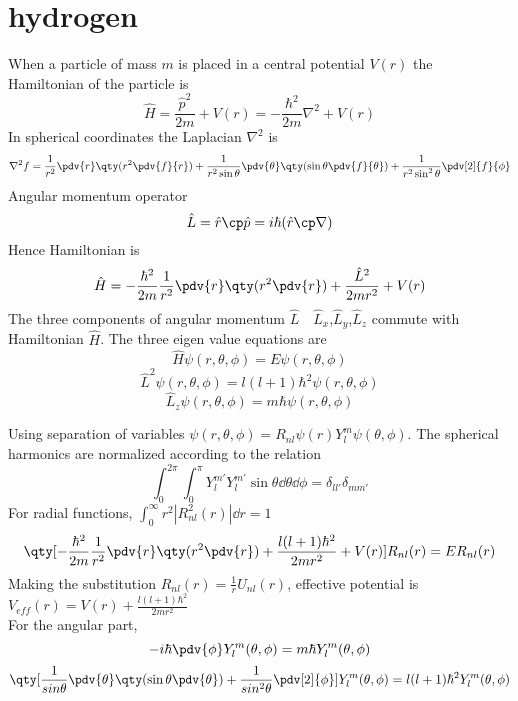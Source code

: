 \section*{hydrogen}

When a particle of mass $m$ is placed in a central potential $V(r)$ the Hamiltonian of the particle is \[\hat{H}=\frac{\hat{p}^2}{2m}+V(r)=-\frac{\hbar^2}{2m}\nabla^2+V(r)\] 
In spherical coordinates the Laplacian $\nabla^2$ is \[\nabla^2f=\frac{1}{r^2}\pdv{r}\qty(r^2\pdv{f}{r})+\frac{1}{r^2\sin\theta}\pdv{\theta}\qty(\sin\theta\pdv{f}{\theta})+\frac{1}{r^2\sin^2\theta}\pdv[2]{f}{\phi}\] 
Angular momentum operator \[\hat{L}=\hat{r}\cp\hat{p}=i\hbar(\hat{r}\cp\nabla)\]
Hence Hamiltonian is \[\hat{H}=-\frac{\hbar^2}{2m}\frac{1}{r^2}\pdv{r}\qty(r^2\pdv{r})+\frac{\hat{L}^2}{2mr^2}+V(r)\]
The three components of angular momentum $\hat{L}\quad$$\hat{L}_x$,$\hat{L}_y$,$\hat{L}_z$ commute with Hamiltonian $\hat{H}$.
The three eigen value equations are 
\[\hat{H}\psi(r,\theta,\phi)=E\psi(r,\theta,\phi)\]
\[\hat{L}^2\psi(r,\theta,\phi)=l(l+1)\hbar^2\psi(r,\theta,\phi)\]
\[\hat{L}_z\psi(r,\theta,\phi)=m\hbar\psi(r,\theta,\phi)\]

Using separation of variables $\psi(r,\theta,\phi)=R_{nl}\psi(r)Y^m_l\psi(\theta,\phi)$.
The spherical harmonics are normalized according to the relation \[\int_{0}^{2\pi}\int_{0}^{\pi}Y^{m'}_{l}Y^{m'}_{l}\sin\theta\dd\theta\dd\phi=\delta_{ll'}\delta_{mm'}\]
For radial functions, $\int_{0}^{\infty}r^2|R_{nl}^2(r)|\dd{r}=1$
\[\qty[-\frac{\hbar^2}{2m}\frac{1}{r^2}\pdv{r}\qty(r^2\pdv{r})+\frac{l(l+1)\hbar^2}{2mr^2}+V(r)]R_{nl}(r)=ER_{nl}(r)\]
Making the substitution $R_{nl}(r)=\frac{1}{r}U_{nl}(r)$, effective potential is $V_{eff}(r)=V(r)+\frac{l(l+1)\hbar^2}{2mr^2}$
\\
For the angular part, \[-i\hbar\pdv{\phi}Y^m_l(\theta,\phi)=m\hbar Y^m_l(\theta,\phi)\]
\[\qty[\frac{1}{sin\theta}\pdv{\theta}\qty(\sin\theta\pdv{\theta})+\frac{1}{sin^2\theta}\pdv[2]{\phi}]Y^m_l(\theta,\phi)=l(l+1)\hbar^2 Y^m_l(\theta,\phi)\]